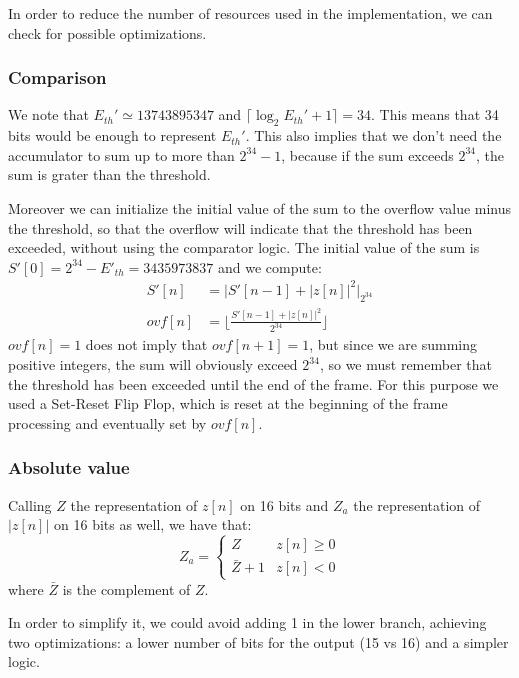 In order to reduce the number of resources used in the implementation, we can
check for possible optimizations.

\subsubsection{Comparison}
We note that $E_{th}' \simeq 13743895347$ and $\lceil\log_2 E_{th}' + 1\rceil = 34$.
This means that 34 bits would be enough to represent $E_{th}'$. This also implies
that we don't need the accumulator to sum up to more than $2^{34} - 1$, because
if the sum exceeds $2^{34}$, the sum is grater than the threshold.

Moreover we can initialize the initial value of the sum to the overflow value
minus the threshold, so that the overflow will indicate that the threshold has
been exceeded, without using the comparator logic. The initial value of the sum
is $S'[0] = 2^{34} - E'_{th} = 3435973837$ and we compute:
\begin{align*}
  S'[n] &= \bigg| S'[n-1] + |z[n]|^2 \bigg|_{2^{34}}\\
  ovf[n] &= \bigg\lfloor \frac{S'[n-1] + |z[n]|^2}{2^{34}} \bigg\rfloor
\end{align*}
$ovf[n] = 1$ does not imply that $ovf[n + 1] = 1$, but since we are summing
positive integers, the sum will obviously exceed $2^{34}$, so we must remember
that the threshold has been exceeded until the end of the frame.
For this purpose we used a Set-Reset Flip Flop, which is reset at the beginning
of the frame processing and eventually set by $ovf[n]$.

\subsubsection{Absolute value}
\label{sec:opt-abs}

Calling $Z$ the representation of $z[n]$ on 16 bits and $Z_a$ the representation
of $|z[n]|$ on 16 bits as well, we have that:
\begin{equation}
  Z_a = \begin{cases}
    Z & z[n] \ge 0 \\
    \bar{Z}+1 & z[n] < 0
  \end{cases}
\end{equation}
where $\bar{Z}$ is the complement of $Z$.

In order to simplify it, we could avoid adding 1 in the lower branch, achieving
two optimizations: a lower number of bits for the output (15 vs 16) and a
simpler logic.


